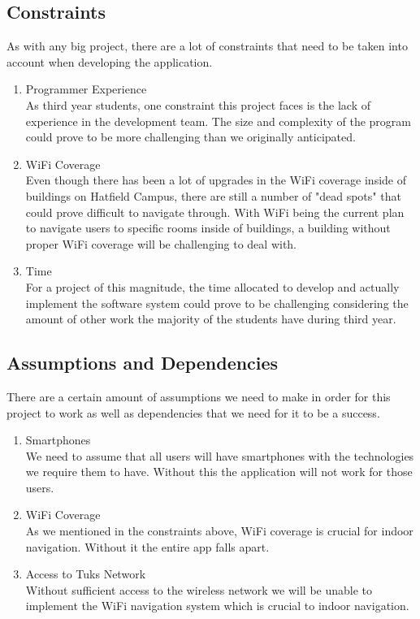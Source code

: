 \documentclass[a4paper,10pt]{article}
\begin{document}
	\subsection{Constraints}
	As with any big project, there are a lot of constraints that need to be taken into account when developing the application.
		\begin{enumerate}
			\item Programmer Experience \\
			As third year students, one constraint this project faces is the lack of experience in the development team. The size and complexity of the program could prove to be more challenging than we originally anticipated.
			
			\item WiFi Coverage \\
			Even though there has been a lot of upgrades in the WiFi coverage inside of buildings on Hatfield Campus, there are still a number of "dead spots" that could prove difficult to navigate through. With WiFi being the current plan to navigate users to specific rooms inside of buildings, a building without proper WiFi coverage will be challenging to deal with.
			
			\item Time \\
			For a project of this magnitude, the time allocated to develop and actually implement the software system could prove to be challenging considering the amount of other work the majority of the students have during third year.
		\end{enumerate}
	\subsection{Assumptions and Dependencies}
		There are a certain amount of assumptions we need to make in order for this project to work as well as dependencies that we need for it to be a success. 
		\begin{enumerate}
			\item Smartphones \\
			We need to assume that all users will have smartphones with the technologies we require them to have. Without this the application will not work for those users.
			
			\item WiFi Coverage \\
			As we mentioned in the constraints above, WiFi coverage is crucial for indoor navigation. Without it the entire app falls apart.
			
			\item Access to Tuks Network \\
			Without sufficient access to the wireless network we will be unable to implement the WiFi navigation system which is crucial to indoor navigation.
		\end{enumerate}
		
\end{document}
